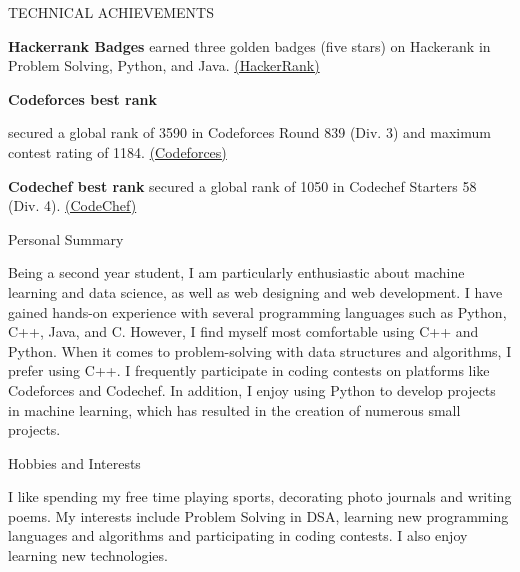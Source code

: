 \documentclass{resume} %
\begin{document}
\begin{rSection}{TECHNICAL ACHIEVEMENTS}
\vspace{-1.25em}

\item \textbf{Hackerrank Badges} {earned three golden badges (five stars) on Hackerank in Problem Solving, Python, and Java.
\href{https://www.hackerrank.com/zoyaaax}{(HackerRank)}   }


\item \textbf{Codeforces best rank} {secured a global rank of 3590 in Codeforces Round 839 (Div. 3) and maximum contest rating of 1184. 
\href{https://codeforces.com/profile/zoyaaax}{(Codeforces)}   

\item \textbf{Codechef best rank} {secured a global rank of 1050 in Codechef Starters 58 (Div. 4).
\href{https://www.codechef.com/users/shristythakur}{(CodeChef)}   }
\\
}



\end{rSection} 


\begin{rSection}{Personal Summary }

Being a second year student, I am particularly enthusiastic about machine learning and data science, as well as web designing and web development.
I have gained hands-on experience with several programming languages such as Python, C++, Java, and C. However, I find myself most comfortable using C++ and Python. When it comes to problem-solving with data structures and algorithms, I prefer using C++. I frequently participate in coding contests on platforms like Codeforces and Codechef. In addition, I enjoy using Python to develop projects in machine learning, which has resulted in the creation of numerous small projects.\\


\end{rSection} 



\begin{rSection}{Hobbies and Interests}

{
I like spending my free time playing sports, decorating photo journals and writing poems. 
 My interests include Problem Solving in DSA, learning new programming languages and algorithms and participating in coding contests. I also enjoy learning new technologies. \\

}
\end{rSection} 
\end{document}
